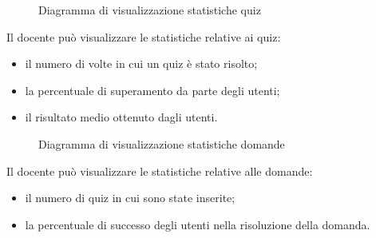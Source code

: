 \documentclass[a4paper, titlepage]{article}
\begin{document}
\newpage
{}
\begin{figure}[H]
	\centering
	\noindent{}
	\caption{Diagramma di visualizzazione statistiche quiz}
\end{figure}
Il docente può visualizzare le statistiche relative ai quiz: 
\begin{itemize}
	\item il numero di volte in cui un quiz è stato risolto; 
	\item la percentuale di superamento da parte degli utenti;
	\item il risultato medio ottenuto dagli utenti.
\end{itemize}

\newpage
{}
\begin{figure}[H]
	\centering
	\noindent{}
	\caption{Diagramma di visualizzazione statistiche domande}
\end{figure}
Il docente può visualizzare le statistiche relative alle domande: 
\begin{itemize}
	\item il numero di quiz in cui sono state inserite;
	\item la percentuale di successo degli utenti nella risoluzione della domanda.
\end{itemize}
\end{document}

